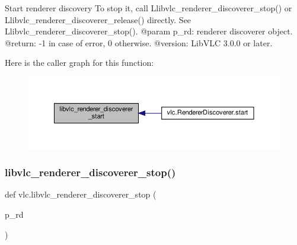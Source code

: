 \begin{DoxyVerb}Start renderer discovery
To stop it, call L{libvlc_renderer_discoverer_stop}() or
L{libvlc_renderer_discoverer_release}() directly.
See L{libvlc_renderer_discoverer_stop}().
@param p_rd: renderer discoverer object.
@return: -1 in case of error, 0 otherwise.
@version: LibVLC 3.0.0 or later.
\end{DoxyVerb}
 Here is the caller graph for this function\+:
\nopagebreak
\begin{figure}[H]
\begin{center}
\leavevmode
\includegraphics[width=350pt]{namespacevlc_a0386aa768d1743a6462da7bd8266c7b6_icgraph}
\end{center}
\end{figure}
\mbox{\label{namespacevlc_a2fab3a4810e94af669b4ac595dd32632}} 
\subsubsection{\texorpdfstring{libvlc\+\_\+renderer\+\_\+discoverer\+\_\+stop()}{libvlc\_renderer\_discoverer\_stop()}}
{\footnotesize\ttfamily def vlc.\+libvlc\+\_\+renderer\+\_\+discoverer\+\_\+stop (\begin{DoxyParamCaption}\item[{}]{p\+\_\+rd }\end{DoxyParamCaption})}

